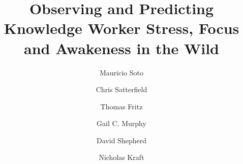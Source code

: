 \documentclass[final,1p,times,plainnat]{elsarticle}
\begin{document}
\begin{frontmatter}


\title{Observing and Predicting Knowledge Worker Stress, Focus and Awakeness in the Wild}


\author{Mauricio Soto}
\address{Hitachi ABB Power Grids, Raleigh, North Carolina}

\author{Chris Satterfield}
\address{The University of British Columbia, Vancouver, British Columbia}

\author{Thomas Fritz}
\address{University of Zurich, Zurich, Switzerland}

\author{Gail C. Murphy}
\address{The University of British Columbia, Vancouver, British Columbia }

\author{David Shepherd}
\address{Virginia Commonwealth University, Richmond, Virginia}

\author{Nicholas Kraft}
\address{UserVoice, Raleigh, North Carolina}



\end{frontmatter}
\end{document}

